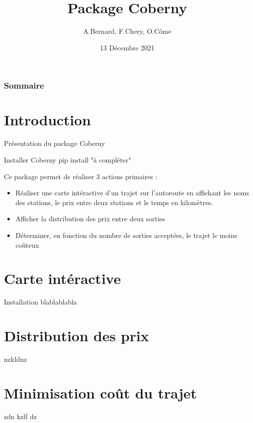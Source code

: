 \documentclass{beamer}
\title{Package Coberny}
\author{A.Bernard, F.Chery, O.Côme}\institute{Faculté des sciences de Montpellier}
\date{13 Décembre 2021}
\begin{document}
\begin{frame}
\titlepage
\end{frame}

\begin{frame}
  \frametitle{Sommaire}
  \tableofcontents
\end{frame}

\section{Introduction}
\begin{frame}[fragile]{Présentation du package Coberny}

\begin{block}{Installer Coberny}
pip install "à compléter"
\end{block}

Ce package permet de réaliser 3 actions primaires : \newline
\begin{itemize}
\item Réaliser une carte intéractive d'un trajet sur l'autoroute en affichant les noms des stations, le prix entre deux stations et le temps en kilomètres.
\item Afficher la distribution des prix entre deux sorties
\item Déterminer, en fonction du nombre de sorties acceptées, le trajet le moins coûteux
\end{itemize}
\end{frame}


\section{Carte intéractive}
\begin{frame}
\begin{block}{Installation}
blablablabla
\end{block}
\end{frame}


\section{Distribution des prix}
\begin{frame}
nzkldnz
\end{frame}

\section{Minimisation coût du trajet}
\begin{frame}
zdn kzlf dz
\end{frame}
\end{document}
